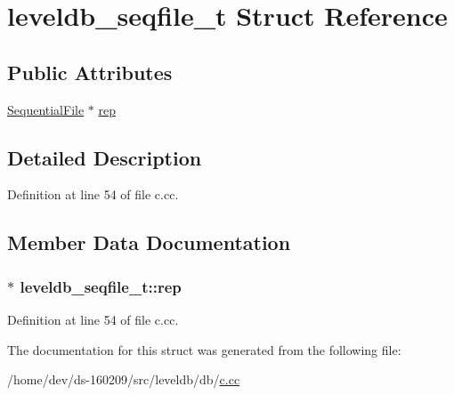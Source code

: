 \hypertarget{structleveldb__seqfile__t}{}\section{leveldb\+\_\+seqfile\+\_\+t Struct Reference}
\label{structleveldb__seqfile__t}
\subsection*{Public Attributes}
\begin{DoxyCompactItemize}
\item 
\hyperlink{classleveldb_1_1_sequential_file}{Sequential\+File} $\ast$ \hyperlink{structleveldb__seqfile__t_a84b4a8638a6ad109e65b3c7923fde915}{rep}
\end{DoxyCompactItemize}


\subsection{Detailed Description}


Definition at line 54 of file c.\+cc.



\subsection{Member Data Documentation}
\hypertarget{structleveldb__seqfile__t_a84b4a8638a6ad109e65b3c7923fde915}{}
\subsubsection[{rep}]{$\ast$ leveldb\+\_\+seqfile\+\_\+t\+::rep}\label{structleveldb__seqfile__t_a84b4a8638a6ad109e65b3c7923fde915}


Definition at line 54 of file c.\+cc.



The documentation for this struct was generated from the following file\+:\begin{DoxyCompactItemize}
\item 
/home/dev/ds-\/160209/src/leveldb/db/\hyperlink{c_8cc}{c.\+cc}\end{DoxyCompactItemize}
